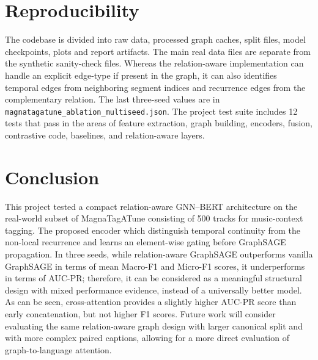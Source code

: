 \documentclass[conference]{IEEEtran}
\begin{document}
\section{Reproducibility}
The codebase is divided into raw data, processed graph caches, split files, model checkpoints, plots and report artifacts. The main real data files are separate from the synthetic sanity-check files. Whereas the relation-aware implementation can handle an explicit edge-type if present in the graph, it can also identifies temporal edges from neighboring segment indices and recurrence edges from the complementary relation. The last three-seed values are in \texttt{magnatagatune\_ablation\_multiseed.json}. The project test suite includes 12 tests that pass in the areas of feature extraction, graph building, encoders, fusion, contrastive code, baselines, and relation-aware layers.

\section{Conclusion}
This project tested a compact relation-aware GNN--BERT architecture on the real-world subset of MagnaTagATune consisting of 500 tracks for music-context tagging. The proposed encoder which distinguish temporal continuity from the non-local recurrence and learns an element-wise gating before GraphSAGE propagation. In three seeds, while relation-aware GraphSAGE outperforms vanilla GraphSAGE in terms of mean Macro-F1 and Micro-F1 scores, it underperforms in terms of AUC-PR; therefore, it can be considered as a meaningful structural design with mixed performance evidence, instead of a universally better model. As can be seen, cross-attention provides a slightly higher AUC-PR score than early concatenation, but not higher F1 scores. Future work will consider evaluating the same relation-aware graph design with larger canonical split and with more complex paired captions, allowing for a more direct evaluation of graph-to-language attention.
\end{document}
